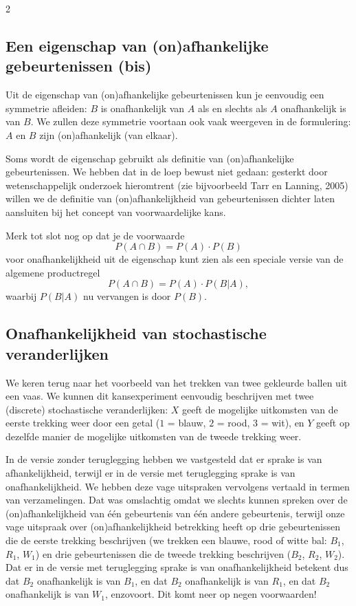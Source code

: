 \begin{multicols} {2}

\subsection*{Een eigenschap van (on)afhankelijke gebeurtenissen (bis)}

Uit de eigenschap van (on)afhankelijke gebeurtenissen kun je eenvoudig een symmetrie afleiden: $B$ is onafhankelijk van $A$ als en slechts als $A$ onafhankelijk is van $B$. We zullen deze symmetrie voortaan ook vaak weergeven in de formulering: $A$ en $B$ zijn (on)afhankelijk (van elkaar).

Soms wordt de eigenschap gebruikt als definitie van (on)afhankelijke gebeurtenissen. We hebben dat in de loep bewust niet gedaan: gesterkt door wetenschappelijk onderzoek hieromtrent (zie bijvoorbeeld Tarr en Lanning, 2005) willen we de definitie van (on)afhankelijkheid van gebeurtenissen dichter laten aansluiten bij het concept van voorwaardelijke kans.

Merk tot slot nog op dat je de voorwaarde
$$P(A \cap B)=P(A) \cdot P(B)$$
voor onafhankelijkheid uit de eigenschap kunt zien als een speciale versie van de algemene productregel
$$P(A \cap B)=P(A) \cdot P(B|A),$$
waarbij $P(B|A)$ nu vervangen is door $P(B)$. 
\vspace{0.5cm}

\subsection*{Onafhankelijkheid van stochastische veranderlijken}

We keren terug naar het voorbeeld van het trekken van twee gekleurde ballen uit een vaas. We kunnen dit kansexperiment eenvoudig beschrijven met twee (discrete) stochastische veranderlijken: $X$ geeft de mogelijke uitkomsten van de eerste trekking weer door een getal ($1$ = blauw, $2$ = rood, $3$ = wit), en $Y$ geeft op dezelfde manier de mogelijke uitkomsten van de tweede trekking weer.

In de versie zonder teruglegging hebben we vastgesteld dat er sprake is van afhankelijkheid, terwijl er in de versie met teruglegging sprake is van onafhankelijkheid. We hebben deze vage uitspraken vervolgens vertaald in termen van verzamelingen. Dat was omslachtig omdat we slechts kunnen spreken over de (on)afhankelijkheid van één gebeurtenis van één andere gebeurtenis, terwijl onze vage uitspraak over (on)afhankelijkheid betrekking heeft op drie gebeurtenissen die de eerste trekking beschrijven (we trekken een blauwe, rood of witte bal: $B_1$, $R_1$, $W_1$) en drie gebeurtenissen die de tweede trekking beschrijven ($B_2$, $R_2$, $W_2$). Dat er in de versie met teruglegging sprake is van onafhankelijkheid betekent dus dat $B_2$ onafhankelijk is van $B_1$, en dat $B_2$ onafhankelijk is van $R_1$, en dat $B_2$ onafhankelijk is van $W_1$, enzovoort. Dit komt neer op negen voorwaarden!


\end{multicols}
